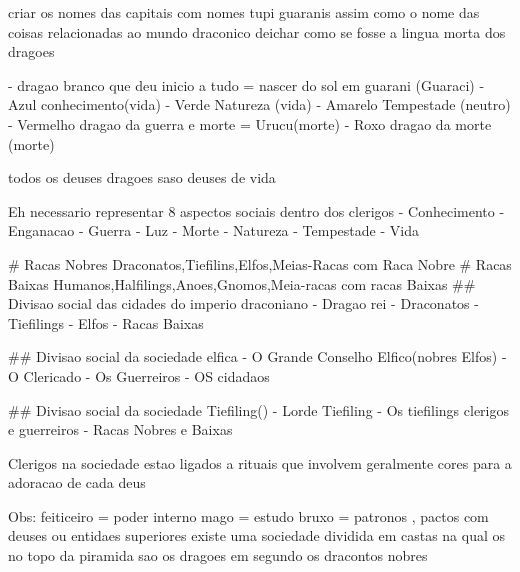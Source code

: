 criar os nomes das capitais com nomes tupi guaranis assim como o nome das coisas relacionadas ao mundo draconico deichar como se fosse a lingua morta dos dragoes 

- dragao branco que deu inicio a tudo = nascer do sol em guarani (Guaraci)
- Azul conhecimento(vida)
- Verde Natureza (vida)
- Amarelo Tempestade            (neutro)
- Vermelho dragao da guerra e morte = Urucu(morte)
- Roxo dragao da morte (morte)

todos os deuses dragoes saso deuses de vida 

Eh necessario representar 8 aspectos sociais dentro dos clerigos 
- Conhecimento
- Enganacao 
- Guerra 
- Luz 
- Morte
- Natureza 
- Tempestade 
- Vida 


   
# Racas Nobres    
	Draconatos,Tiefilins,Elfos,Meias-Racas com Raca Nobre
# Racas Baixas 
Humanos,Halfilings,Anoes,Gnomos,Meia-racas com racas Baixas
## Divisao social das cidades do imperio draconiano
- Dragao rei
- Draconatos
- Tiefilings
- Elfos 
- Racas Baixas

## Divisao social da sociedade elfica 
- O Grande Conselho Elfico(nobres Elfos)
- O Clericado 
- Os Guerreiros 
- OS cidadaos

## Divisao social da sociedade Tiefiling()
- Lorde Tiefiling
- Os tiefilings clerigos e guerreiros  
- Racas Nobres e Baixas 

Clerigos na sociedade estao ligados a rituais que involvem geralmente cores para a adoracao de cada deus

Obs: 
	 feiticeiro = poder interno
     mago = estudo
     bruxo = patronos , pactos com deuses ou entidaes superiores
     existe uma sociedade dividida em castas na qual os no topo da piramida sao os dragoes em segundo os dracontos nobres
 

